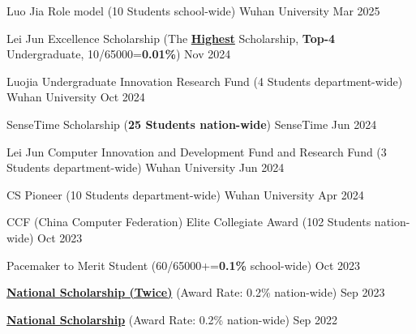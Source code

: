 Luo Jia Role model (10 Students school-wide) Wuhan University \hfill Mar 2025 \par
Lei Jun Excellence Scholarship (The \underline{\textbf{Highest}} Scholarship, \textbf{Top-4} Undergraduate, 10/65000=\textbf{0.01\%}) \hfill Nov 2024 \par
Luojia Undergraduate Innovation Research Fund (4 Students department-wide) Wuhan University \hfill Oct 2024 \par
SenseTime Scholarship (\textbf{25 Students nation-wide}) SenseTime \hfill Jun 2024 \par
Lei Jun Computer Innovation and Development Fund and Research Fund (3 Students department-wide) Wuhan University \hfill Jun 2024 \par
CS Pioneer (10 Students department-wide) Wuhan University \hfill Apr 2024 \par
CCF (China Computer Federation) Elite Collegiate Award (102 Students nation-wide) \hfill Oct 2023 \par
Pacemaker to Merit Student (60/65000+=\textbf{0.1\%} school-wide) \hfill Oct 2023 \par
\underline{\textbf{National Scholarship (Twice)}} (Award Rate: 0.2\% nation-wide) \hfill Sep 2023 \par
\underline{\textbf{National Scholarship}} (Award Rate: 0.2\% nation-wide) \hfill Sep 2022 \par